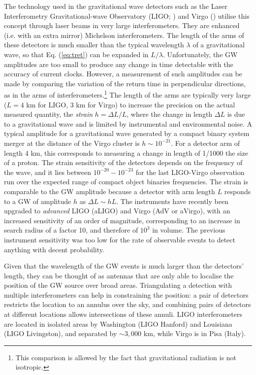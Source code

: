 The technology used in the gravitational wave detectors such as the Laser Interferometry Gravitational-wave Observatory (LIGO; \citealt{aligo}) and Virgo (\citealt{avirgo}) utilise this concept through laser beams in very large interferometers. They are enhanced (i.e. with an extra mirror) Michelson interferometers. The length of the arms of these detectors is much smaller than the typical wavelength $\lambda$ of a gravitational wave, so that Eq. (\ref{eq:tret}) can be expanded in $L/\lambda$. Unfortunately, the GW amplitudes are too small to produce any change in time detectable with the accuracy of current clocks. However, a measurement of such amplitudes can be made by comparing the variation of the return time in perpendicular directions, as in the arms of interferometers.\footnote{This comparison is allowed by the fact that gravitational radiation is not isotropic.} The length of the arms are typically very large ($L=4$ km for LIGO, 3 km for Virgo) to increase the precision on the actual measured quantity, the \emph{strain} $h=\Delta L/L$, where the change in length $\Delta L$ is due to a gravitational wave and is limited by instrumental and environmental noise. A typical amplitude for a gravitational wave generated by a compact binary system merger at the distance of the Virgo cluster is $h\sim 10^{-21}$. For a detector arm of length 4 km, this corresponds to measuring a change in length of 1/1000 the size of a proton. The strain sensitivity of the detectors depends on the frequency of the wave, and it lies between $10^{-20}-10^{-23}$ for the last LIGO-Virgo observation run over the expected range of compact object binaries frequencies. The strain is comparable to the GW amplitude because a detector with arm length $L$ responds to a GW of amplitude $h$ as $\Delta L \sim hL$. The instruments have recently been upgraded to \emph{advanced} LIGO (aLIGO) and Virgo (AdV or aVirgo), with an increased sensitivity of an order of magnitude, corresponding to an increase in search radius of a factor 10, and therefore of $10^3$ in volume. The previous instrument sensitivity was too low for the rate of observable events to detect anything with decent probability.

Given that the wavelength of the GW events is much larger than the detectors' length, they can be thought of as antennas that are only able to localise the position of the GW source over broad areas. Triangulating a detection with multiple interferometers can help in constraining the position: a pair of detectors restricts the location to an annulus over the sky, and combining pairs of detectors at different locations allows intersections of these annuli. LIGO interferometers are located in isolated areas by Washington (LIGO Hanford) and Louisiana (LIGO Livingston), and separated by $\sim 3,000$ km, while Virgo is in Pisa (Italy).

